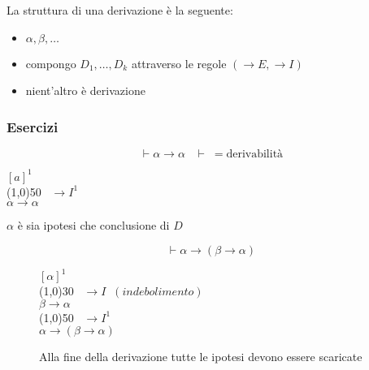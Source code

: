 \documentclass{article}
\theoremstyle{break}
\theoremstyle{break}
\theoremstyle{break}
\theoremstyle{break}
\begin{document}
La struttura di una derivazione è la seguente:
\begin{itemize}
    \item \( \alpha,\beta, \ldots \) 
    \item compongo \( D_1, \ldots, D_k \) attraverso le regole \( (\to E, \to I) \) 
    \item nient'altro è derivazione
\end{itemize}

\subsubsection{Esercizi}
\begin{exercise}
    \[
        \vdash \alpha \to \alpha \;\;\; \vdash\; = \text{derivabilità}
    \] 
    \begin{center}
        \(
        [a]^1
        \)\\
        \hspace{1cm}\line(1,0){50}\(\;\;\; \to I^1 \)\\  
        \(
            \alpha \to \alpha
        \) 
    \end{center}
\( \alpha \) è sia ipotesi che conclusione di \( D \) 
\end{exercise}
\begin{figure}[H]
    \begin{exercise}
        \[
            \vdash \alpha \to (\beta \to \alpha)
        \] 
        \begin{center}
            \(
            [\alpha]^1
            \)\\
            \hspace{3.6cm}\line(1,0){30}\(\;\;\; \to I\;\; (indebolimento) \)\\  
             \( \beta \to \alpha \) \\
            \hspace{1cm}\line(1,0){50}\(\;\;\; \to I^1 \)\\  
            \(
            \alpha \to (\beta \to \alpha)
            \)
        \end{center}
        Alla fine della derivazione tutte le ipotesi devono essere scaricate
    \end{exercise}
\end{figure}
\end{document}
